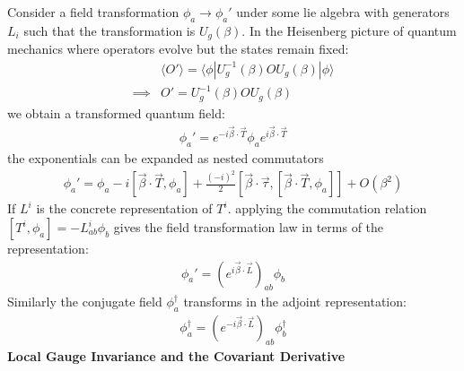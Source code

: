 Consider a field transformation $\phi_a \rightarrow \phi_a'$ under some lie algebra with
generators $L_i$ such that the transformation is $U_g(\beta)$. In the Heisenberg picture of quantum mechanics 
where operators evolve but the states remain fixed:
\begin{align*}
&\langle O' \rangle = \langle \phi | U_g^{-1}(\beta) O U_g(\beta) | \phi \rangle\\
\implies & O'= U_g^{-1}(\beta) O U_g(\beta)
\end{align*}
we obtain a transformed quantum field:
\begin{align*}
\phi_a' = e^{-i \vec \beta \cdot \vec T} \phi_a e^{i \vec \beta \cdot \vec T}
\end{align*}
the exponentials can be expanded as nested commutators 
\begin{align*}
\phi_a' = \phi_a - i [ \vec \beta \cdot \vec T, \phi_a] + \frac{(-i)^2}{2}[ \vec \beta \cdot \vec \tau, [ \vec \beta \cdot \vec T, \phi_a]] + O(\beta^2)
\end{align*}
If  $L^i$ is the concrete representation of $T^i$. applying the commutation relation
 $[T^i, \phi_a] = - L_{ab}^i \phi_b$ gives the field transformation law in terms of the representation:
\begin{align*}
\phi_a' = \left (e^{i \vec \beta \cdot \vec L} \right)_{ab} \phi_b 
\end{align*}
Similarly the conjugate field $\phi^\dagger_a$ transforms in the adjoint representation:
\begin{align*}
\phi_a^\dagger = \left( e^{-i \vec \beta \cdot \vec L} \right)_{ab} \phi^\dagger_b 
\end{align*}
\textbf{Local Gauge Invariance and the Covariant Derivative} \cite{peskin}

